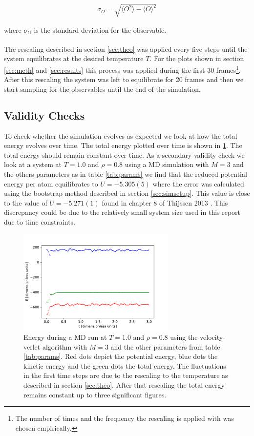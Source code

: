 \documentclass[10 pt, a4paper]{article}
\begin{document}
\begin{align*}
\sigma_O = \sqrt{\langle O ^2 \rangle - \langle O \rangle ^2}
\end{align*}

where $\sigma_O$ is the standard deviation for the observable.
\\
\\
The rescaling described in section \ref{sec:theo} was applied every five steps until the system equilibrates at the desired temperature $T$. For the plots shown in section \ref{sec:meth} and \ref{sec:results} this process was applied during the first 30 frames\footnote{The number of times and the frequency the rescaling is applied with was chosen empirically.}. After this rescaling the system was left to equilibrate for 20 frames and then we start sampling for the observables until the end of the simulation.

\subsection{Validity Checks}

To check whether the simulation evolves as expected we look at how the total energy evolves over time. The total energy plotted over time is shown in \ref{fig:energycon}. The total energy should remain constant over time. As a secondary validity check we look at a system at $T = 1.0$ and $\rho = 0.8$ using a MD simulation with $M = 3$ and the others parameters as in table \ref{tab:params} we find that the reduced potential energy per atom equilibrates to $U = -5.305(5)$ where the error was calculated using the bootstrap method described in section \ref{sec:simsetup}. This value is close to the value of $U = -5.271(1)$ found in chapter 8 of Thijssen 2013 \cite{thijssen}. This discrepancy could be due to the relatively small system size used in this report due to time constraints.

\begin{figure}[H]
\centering
\includegraphics[width=0.7\textwidth]{energycon}
\caption{Energy during a MD run at $T = 1.0$ and $\rho = 0.8$ using the velocity-verlet algorithm with $M = 3$ and the other parameters from table \ref{tab:params}. Red dots depict the potential energy, blue dots the kinetic energy and the green dots the total energy. The fluctuations in the first time steps are due to the rescaling to the temperature as described in section \ref{sec:theo}. After that rescaling the total energy remains constant up to three significant figures. }
\label{fig:energycon}
\end{figure}
\end{document}
